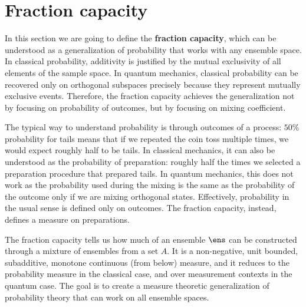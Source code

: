 \section{Fraction capacity}

In this section we are going to define the \textbf{fraction capacity}, which can be understood as a generalization of probability that works with any ensemble space. In classical probability, additivity is justified by the mutual exclusivity of all elements of the sample space. In quantum mechanics, classical probability can be recovered only on orthogonal subspaces precisely because they represent mutually exclusive events. Therefore, the fraction capacity achieves the generalization not by focusing on probability of outcomes, but by focusing on mixing coefficient.


The typical way to understand probability is through outcomes of a process: $50\%$ probability for tails means that if we repeated the coin toss multiple times, we would expect roughly half to be tails. In classical mechanics, it can also be understood as the probability of preparation: roughly half the times we selected a preparation procedure that prepared tails. In quantum mechanics, this does not work as the probability used during the mixing is the same as the probability of the outcome only if we are mixing orthogonal states. Effectively, probability in the usual sense is defined only on outcomes. The fraction capacity, instead, defines a measure on preparations.

The fraction capacity tells us how much of an ensemble $\ens$ can be constructed through a mixture of ensembles from a set $A$. It is a non-negative, unit bounded, subadditive, monotone continuous (from below) measure, and it reduces to the probability measure in the classical case, and over measurement contexts in the quantum case. The goal is to create a measure theoretic generalization of probability theory that can work on all ensemble spaces.

